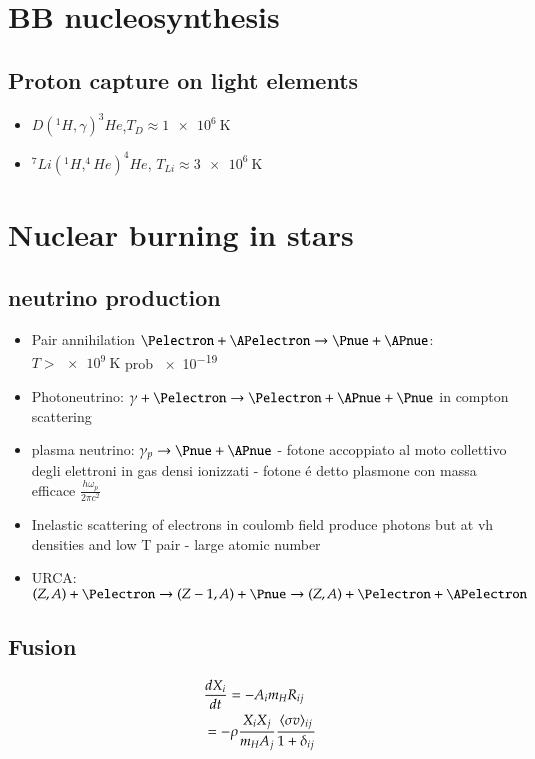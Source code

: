 \documentclass[main.tex]{subfiles}
\begin{document}
\chapter{BB nucleosynthesis}
\PartialToc

\section{Proton capture on light elements}

\begin{itemize}
\item $D(^1H,\gamma)^3He$,$T_D\approx \SI{1e6}{\kelvin}$
\item $^7Li(^1H,^4He)^4He$, $T_{Li}\approx\SI{3e6}{\kelvin}$ 

\end{itemize}

\chapter{Nuclear burning in stars}
\PartialToc

\section{neutrino production}
\begin{itemize}
\item  Pair annihilation $\Pelectron+\APelectron\to\Pnue+\APnue$: $T>\SI{e9}{\kelvin}$ prob \num{e-19}
\item Photoneutrino: $\gamma+\Pelectron\to\Pelectron+\APnue+\Pnue$ in compton scattering
\item plasma neutrino: $\gamma_p\to\Pnue+\APnue$ - fotone accoppiato al moto collettivo degli elettroni in gas densi ionizzati - fotone \'e detto plasmone con massa efficace $\frac{h\omega_p}{2\pi c^2}$
\item Inelastic scattering of electrons in coulomb field produce photons but at vh densities and low T \Pnue\APnue pair - large atomic number
\item URCA: $(Z,A)+\Pelectron\to(Z-1,A)+\Pnue\to(Z,A)+\Pelectron+\APelectron$
\end{itemize}
\section{Fusion}
\begin{align*}
&\TDy{t}{X_i}=-A_im_HR_{ij}\\
&=-\rho\frac{X_iX_j}{m_HA_j}\frac{\exv{\sigma v}_{ij}}{1+\delta_{ij}}
\end{align*} 
\end{document}
